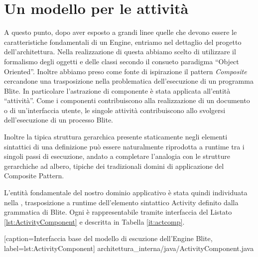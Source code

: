 \section{Un modello per le attività}
A questo punto, dopo aver esposto a grandi linee quelle che devono essere le
caratteristiche fondamentali di un Engine, entriamo nel dettaglio del progetto
dell'architettura. Nella realizzazione di questa abbiamo scelto di utilizzare il
formalismo degli oggetti e delle classi secondo il consueto paradigma ``Object
Oriented''. Inoltre abbiamo preso come fonte di ispirazione il pattern
\emph{Composite} \cite{GANGo4} cercandone una trasposizione nella problematica
dell'esecuzione di un programma Blite. In particolare l'astrazione di componente
\`e stata applicata all'entità ``attività''. Come i componenti contribuiscono
alla realizzazione di un documento o di un'interfaccia utente, le singole
attività contribuiscono allo svolgersi dell'esecuzione di un processo Blite.
 
Inoltre la tipica struttura gerarchica presente staticamente negli elementi
sintattici di una definizione può essere naturalmente riprodotta a runtime tra i
singoli passi di esecuzione, andato a completare l'analogia con le strutture
gerarchiche ad albero, tipiche dei tradizionali domini di applicazione del
Composite Pattern.

L'entità fondamentale del nostro dominio applicativo \`e stata quindi
individuata nella , trasposizione a runtime
dell'elemento sintattico Activity definito dalla grammatica di Blite.
Ogni  \`e rappresentabile tramite 
interfaccia del Listato \ref{lst:ActivityComponent} e descritta in Tabella \ref{it:actcomp}.


[caption={Interfaccia base del modello di escuzione dell'Engine Blite},
label=lst:ActivityComponent]
{architettura_interna/java/ActivityComponent.java}

